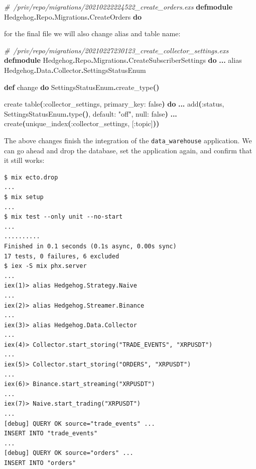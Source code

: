 \documentclass[
  oneside]{book}
\newenvironment{Shaded}{\begin{snugshade}}{\end{snugshade}}
\newcommand{\CommentTok}[1]{\textcolor[rgb]{0.56,0.35,0.01}{\textit{#1}}}
\newcommand{\ConstantTok}[1]{\textcolor[rgb]{0.56,0.35,0.01}{#1}}
\newcommand{\FunctionTok}[1]{\textcolor[rgb]{0.13,0.29,0.53}{\textbf{#1}}}
\newcommand{\ImportTok}[1]{#1}
\newcommand{\KeywordTok}[1]{\textcolor[rgb]{0.13,0.29,0.53}{\textbf{#1}}}
\newcommand{\NormalTok}[1]{#1}
\newcommand{\OperatorTok}[1]{\textcolor[rgb]{0.81,0.36,0.00}{\textbf{#1}}}
\newcommand{\OtherTok}[1]{\textcolor[rgb]{0.56,0.35,0.01}{#1}}
\newcommand{\StringTok}[1]{\textcolor[rgb]{0.31,0.60,0.02}{#1}}
\newcommand{\VariableTok}[1]{\textcolor[rgb]{0.00,0.00,0.00}{#1}}
\begin{document}
\begin{Shaded}
\begin{Highlighting}[]
\CommentTok{\# /priv/repo/migrations/20210222224522\_create\_orders.exs}
\KeywordTok{defmodule} \ConstantTok{Hedgehog}\OperatorTok{.}\ConstantTok{Repo}\OperatorTok{.}\ConstantTok{Migrations}\OperatorTok{.}\ConstantTok{CreateOrders} \KeywordTok{do}
\end{Highlighting}
\end{Shaded}

\newpage

for the final file we will also change alias and table name:

\begin{Shaded}
\begin{Highlighting}[]
\CommentTok{\# /priv/repo/migrations/20210227230123\_create\_collector\_settings.exs}
\KeywordTok{defmodule} \ConstantTok{Hedgehog}\OperatorTok{.}\ConstantTok{Repo}\OperatorTok{.}\ConstantTok{Migrations}\OperatorTok{.}\ConstantTok{CreateSubscriberSettings} \KeywordTok{do}
  \OperatorTok{...}
  \ImportTok{alias} \ConstantTok{Hedgehog}\OperatorTok{.}\ConstantTok{Data}\OperatorTok{.}\ConstantTok{Collector}\OperatorTok{.}\ConstantTok{SettingsStatusEnum}

  \KeywordTok{def}\NormalTok{ change }\KeywordTok{do}
    \ConstantTok{SettingsStatusEnum}\OperatorTok{.}\NormalTok{create\_type}\FunctionTok{()}

\NormalTok{    create table}\FunctionTok{(}\VariableTok{:collector\_settings}\NormalTok{, }\VariableTok{primary\_key:} \ConstantTok{false}\FunctionTok{)} \KeywordTok{do}
      \OperatorTok{...}
\NormalTok{      add}\FunctionTok{(}\VariableTok{:status}\NormalTok{, }\ConstantTok{SettingsStatusEnum}\OperatorTok{.}\NormalTok{type}\FunctionTok{()}\NormalTok{, }\VariableTok{default:} \StringTok{"off"}\NormalTok{, }\VariableTok{null:} \ConstantTok{false}\FunctionTok{)}
    \OperatorTok{...}
\NormalTok{    create}\FunctionTok{(}\NormalTok{unique\_index}\FunctionTok{(}\VariableTok{:collector\_settings}\NormalTok{, }\OtherTok{[}\VariableTok{:topic}\OtherTok{]}\FunctionTok{))}
\end{Highlighting}
\end{Shaded}

The above changes finish the integration of the \texttt{data\_warehouse} application. We can go ahead and drop the database, set the application again, and confirm that it still works:

\begin{verbatim}
$ mix ecto.drop
...
$ mix setup
...
$ mix test --only unit --no-start
...
..........
Finished in 0.1 seconds (0.1s async, 0.00s sync)
17 tests, 0 failures, 6 excluded
$ iex -S mix phx.server
...
iex(1)> alias Hedgehog.Strategy.Naive
...
iex(2)> alias Hedgehog.Streamer.Binance
...
iex(3)> alias Hedgehog.Data.Collector
...
iex(4)> Collector.start_storing("TRADE_EVENTS", "XRPUSDT")
...
iex(5)> Collector.start_storing("ORDERS", "XRPUSDT")
...
iex(6)> Binance.start_streaming("XRPUSDT")
...
iex(7)> Naive.start_trading("XRPUSDT")
...
[debug] QUERY OK source="trade_events" ...
INSERT INTO "trade_events"
...
[debug] QUERY OK source="orders" ...
INSERT INTO "orders"
\end{verbatim}
\end{document}
